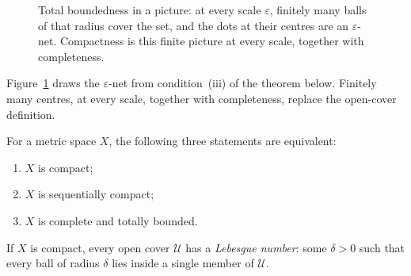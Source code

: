 \begin{figure}[ht]
\centering
{}
\caption{Total boundedness in a picture: at every scale $\varepsilon$, finitely many balls of that radius cover the set, and the dots at their centres are an $\varepsilon$-net. Compactness is this finite picture at every scale, together with completeness.}
\label{fig:net}
\end{figure}

Figure~\ref{fig:net} draws the $\varepsilon$-net from condition~(iii) of the theorem below. Finitely many centres, at every scale, together with completeness, replace the open-cover definition.

\begin{theorem}\label{thm:compactmetric}
For a metric space $X$, the following three statements are equivalent:
\begin{enumerate}[label=(\roman*)]
\item $X$ is compact;
\item $X$ is sequentially compact;
\item $X$ is complete and totally bounded.
\end{enumerate}
If $X$ is compact, every open cover $\mathcal U$ has a \emph{Lebesgue number}: some $\delta>0$ such that every ball of radius $\delta$ lies inside a single member of $\mathcal U$.
\end{theorem}
